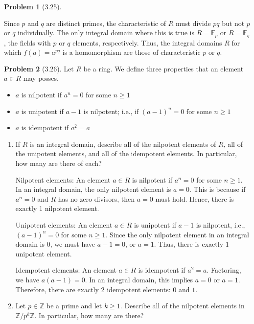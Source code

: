\documentclass[12pt]{article}
\theoremstyle{definition}
\newtheorem{problem}{Problem}
\begin{document}
\begin{problem}[3.25]
\begin{enumerate}[label=(\alph*)]
\begin{solution}
            Since $p$ and $q$ are distinct primes, the characteristic of $R$ must divide $pq$ but not $p$ or $q$ individually. The only integral domain where this is true is $R = \mathbb{F}_p$ or $R = \mathbb{F}_q$, the fields with $p$ or $q$ elements, respectively. Thus, the integral domains $R$ for which $f(a) = a^{pq}$ is a homomorphism are those of characteristic $p$ or $q$.            
        \end{solution}
    \end{enumerate}
\end{problem}

\begin{problem}[3.26]
    Let $R$ be a ring. We define three properties that an element $a \in R$ may posses. 
    \begin{itemize}
        \item $a$ is nilpotent if $a^n = 0$ for some $n \geq 1$
        \item $a$ is unipotent if $a - 1$ is nilpotent; i.e., if $(a - 1)^n = 0$ for some $n \geq 1$
        \item $a$ is idempotent if $a^2 = a$
    \end{itemize}
    \begin{enumerate}[label=(\alph*)]
        \item If $R$ is an integral domain, describe all of the nilpotent elements of $R$, all of the unipotent
                elements, and all of the idempotent elements. In particular, how many are there of each?
            
        \begin{solution}
            Nilpotent elements: An element $a \in R$ is nilpotent if $a^n = 0$ for some $n \geq 1$. In an integral domain, the only nilpotent element is $a = 0$. This is because if $a^n = 0$ and $R$ has no zero divisors, then $a = 0$ must hold. Hence, there is exactly 1 nilpotent element.

            Unipotent elements: An element $a \in R$ is unipotent if $a - 1$ is nilpotent, i.e., $(a - 1)^n = 0$ for some $n \geq 1$. Since the only nilpotent element in an integral domain is 0, we must have $a - 1 = 0$, or $a = 1$. Thus, there is exactly 1 unipotent element.

            Idempotent elements: An element $a \in R$ is idempotent if $a^2 = a$. Factoring, we have $a(a - 1) = 0$. In an integral domain, this implies $a = 0$ or $a = 1$. Therefore, there are exactly 2 idempotent elements: $0$ and $1$.

        \end{solution}
        \item Let $p \in \mathbb{Z}$ be a prime and let $k \geq 1$. Describe all of the nilpotent elements in $\mathbb{Z}/p^k\mathbb{Z}$.
                In particular, how many are there?


\end{enumerate}
\end{problem}
\end{document}
